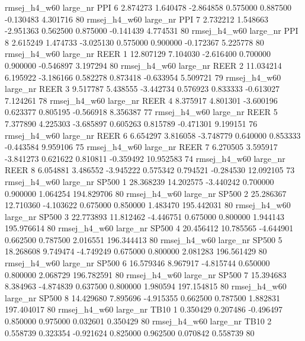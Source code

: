 rmsej_h4_w60   large_nr      PPI                 6  2.874273  1.640478  -2.864858 0.575000 0.887500 -0.130483    4.301716 80
rmsej_h4_w60   large_nr      PPI                 7  2.732212  1.548663  -2.951363 0.562500 0.875000 -0.141439    4.774531 80
rmsej_h4_w60   large_nr      PPI                 8  2.615249  1.474733  -3.025130 0.575000 0.900000 -0.172367    5.225778 80
rmsej_h4_w60   large_nr     REER                 1 12.807129  7.104030  -2.616400 0.700000 0.900000 -0.546897    3.197294 80
rmsej_h4_w60   large_nr     REER                 2 11.034214  6.195922  -3.186166 0.582278 0.873418 -0.633954    5.509721 79
rmsej_h4_w60   large_nr     REER                 3  9.517787  5.438555  -3.442734 0.576923 0.833333 -0.613027    7.124261 78
rmsej_h4_w60   large_nr     REER                 4  8.375917  4.801301  -3.600196 0.623377 0.805195 -0.566918    8.356387 77
rmsej_h4_w60   large_nr     REER                 5  7.377890  4.225303  -3.685897 0.605263 0.815789 -0.471301    9.199151 76
rmsej_h4_w60   large_nr     REER                 6  6.654297  3.816058  -3.748779 0.640000 0.853333 -0.443584    9.959106 75
rmsej_h4_w60   large_nr     REER                 7  6.270505  3.595917  -3.841273 0.621622 0.810811 -0.359492   10.952583 74
rmsej_h4_w60   large_nr     REER                 8  6.054881  3.486552  -3.945222 0.575342 0.794521 -0.284530   12.092105 73
rmsej_h4_w60   large_nr    SP500                 1 28.368239 14.202575  -3.440242 0.700000 0.900000  1.064254  194.829706 80
rmsej_h4_w60   large_nr    SP500                 2 25.286367 12.710360  -4.103622 0.675000 0.850000  1.483470  195.442031 80
rmsej_h4_w60   large_nr    SP500                 3 22.773893 11.812462  -4.446751 0.675000 0.800000  1.944143  195.976614 80
rmsej_h4_w60   large_nr    SP500                 4 20.456412 10.785565  -4.644901 0.662500 0.787500  2.016551  196.344413 80
rmsej_h4_w60   large_nr    SP500                 5 18.268608  9.749474  -4.749249 0.675000 0.800000  2.081283  196.561429 80
rmsej_h4_w60   large_nr    SP500                 6 16.579346  8.967917  -4.815744 0.650000 0.800000  2.068729  196.782591 80
rmsej_h4_w60   large_nr    SP500                 7 15.394683  8.384963  -4.874839 0.637500 0.800000  1.980594  197.154815 80
rmsej_h4_w60   large_nr    SP500                 8 14.429680  7.895696  -4.915355 0.662500 0.787500  1.882831  197.404017 80
rmsej_h4_w60   large_nr     TB10                 1  0.350429  0.207486  -0.496497 0.850000 0.975000  0.032601    0.350429 80
rmsej_h4_w60   large_nr     TB10                 2  0.558739  0.323354  -0.921624 0.825000 0.962500  0.070842    0.558739 80
